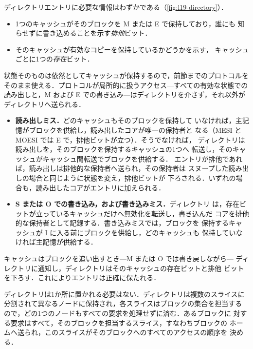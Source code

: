 \documentclass[../main.tex]{subfiles}
\begin{document}
ディレクトリエントリに必要な情報はわずかである（\cref{fig:l19-directory}）．
\begin{itemize}
  \item 1つのキャッシュがそのブロックを M または E で保持しており，誰にも
    知らせずに書き込めることを示す\emph{排他}ビット．
  \item そのキャッシュが有効なコピーを保持しているかどうかを示す，
    キャッシュごとに1つの\emph{存在}ビット．
\end{itemize}
状態そのものは依然としてキャッシュが保持するので，前節までのプロトコルを
そのまま使える．プロトコルが局所的に扱うアクセス---すべての有効な状態での
読み出しと，M および E での書き込み---はディレクトリを介さず，それ以外が
ディレクトリへ送られる．
\begin{itemize}
  \item \textbf{読み出しミス．}どのキャッシュもそのブロックを保持して
    いなければ，主記憶がブロックを供給し，読み出したコアが唯一の保持者と
    なる（MESI と MOESI では E で，排他ビットが立つ）．そうでなければ，
    ディレクトリは読み出しを，そのブロックを保持するキャッシュの1つへ
    転送し，そのキャッシュがキャッシュ間転送でブロックを供給する．
    エントリが排他であれば，読み出しは排他的な保持者へ送られ，その保持者は
    スヌープした読み出しの場合と同じように状態を変え，排他ビットが
    下ろされる．いずれの場合も，読み出したコアがエントリに加えられる．%
  \item \textbf{S または O での書き込み，および書き込みミス．}ディレクトリ
    は，存在ビットが立っているキャッシュだけへ無効化を転送し，書き込んだ
    コアを排他的な保持者として記録する．書き込みミスでは，ブロックを
    保持するキャッシュが I に入る前にブロックを供給し，どのキャッシュも
    保持していなければ主記憶が供給する．
\end{itemize}
キャッシュはブロックを追い出すとき---M または O では書き戻しながら---
ディレクトリに通知し，ディレクトリはそのキャッシュの存在ビットと排他
ビットを下ろす．これによりエントリは正確に保たれる．

ディレクトリは1か所に置かれる必要はない．ディレクトリは複数のスライスに
分割されて異なるノードに保持され，各スライスはブロックの集合を担当する
ので，どの1つのノードもすべての要求を処理せずに済む．あるブロックに
対する要求はすべて，そのブロックを担当するスライス，すなわちブロックの
ホームへ送られ，このスライスがそのブロックへのすべてのアクセスの順序を
決める．
\end{document}
